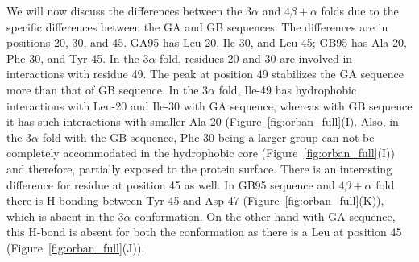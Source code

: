 \documentclass[12pt]{article}
\begin{document}
We will now discuss the differences between the $3 \alpha$ and $4 \beta + \alpha$ folds due to the
specific differences between the GA and GB sequences. The differences are in positions 20, 30, and
45. GA95 has Leu-20, Ile-30, and Leu-45; GB95 has Ala-20, Phe-30, and Tyr-45. In the $3 \alpha$
fold, residues 20 and 30 are involved in interactions with residue 49. The peak at position 49
stabilizes the GA sequence more than that of GB sequence. In the $3 \alpha$ fold, Ile-49 has
hydrophobic interactions with Leu-20 and Ile-30 with GA sequence, whereas with GB sequence it has
such interactions with smaller Ala-20 (Figure~\ref{fig:orban_full}(I). Also, in the $3 \alpha$ fold
with the GB sequence, Phe-30 being a larger group can not be completely accommodated in the
hydrophobic core (Figure~\ref{fig:orban_full}(I)) and therefore, partially exposed to the protein
surface. There is an interesting difference for residue at position 45 as well. In GB95 sequence and
$4 \beta + \alpha$ fold there is H-bonding between Tyr-45 and Asp-47
(Figure~\ref{fig:orban_full}(K)), which is absent in the $3 \alpha$ conformation. On the other hand
with GA sequence, this H-bond is absent for both the conformation as there is a Leu at position 45
(Figure~\ref{fig:orban_full}(J)).
\end{document}
